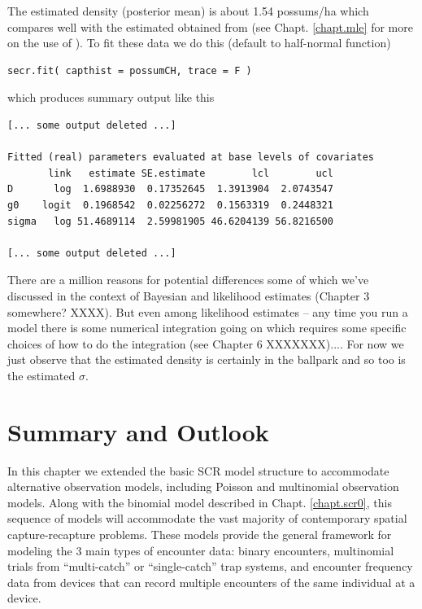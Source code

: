 The estimated density (posterior mean) is about 1.54 possums/ha which
compares well with the estimated obtained from \secr (see
Chapt. \ref{chapt.mle} for more on the use of \secr).
To fit these data we do this (default to half-normal function)
\begin{verbatim}
secr.fit( capthist = possumCH, trace = F )
\end{verbatim}
which produces summary output like this
\begin{verbatim}
[... some output deleted ...]

Fitted (real) parameters evaluated at base levels of covariates 
       link   estimate SE.estimate        lcl        ucl
D       log  1.6988930  0.17352645  1.3913904  2.0743547
g0    logit  0.1968542  0.02256272  0.1563319  0.2448321
sigma   log 51.4689114  2.59981905 46.6204139 56.8216500

[... some output deleted ...]
\end{verbatim}
There are a million reasons for potential differences some of which
we've discussed in the context of Bayesian and likelihood estimates
(Chapter 3 somewhere? XXXX).
But even among likelihood estimates -- any time you run a model there
is some numerical integration going on which requires some specific
choices of how to do the integration (see Chapter 6 XXXXXXX)....
For now we just observe that the estimated density is certainly in the
ballpark and so too is the estimated $\sigma$.













\section{Summary and Outlook}

In this chapter we extended the basic SCR model structure to
accommodate alternative observation models, including Poisson and
multinomial observation models.
Along with the binomial model described in Chapt. \ref{chapt.scr0},
this sequence of models will accommodate the vast majority of
contemporary spatial capture-recapture problems. These models provide
the general framework for modeling the 3 main types of encounter data:
binary encounters, multinomial trials from ``multi-catch'' or
``single-catch'' \citep{efford:2004, efford:2011} trap systems, and encounter frequency
data from devices that can record multiple encounters of the same
individual at a device. 

